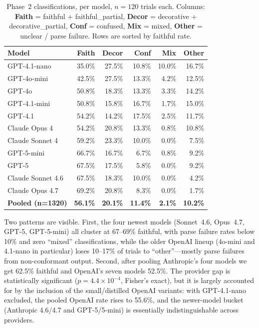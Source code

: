 \documentclass[11pt]{article}
\begin{document}
\begin{table}[t]
\centering
\small
\caption{Phase~2 classifications, per model, $n=120$ trials each. Columns: \textbf{Faith} = faithful + faithful\_partial, \textbf{Decor} = decorative + decorative\_partial, \textbf{Conf} = confused, \textbf{Mix} = mixed, \textbf{Other} = unclear / parse failure. Rows are sorted by faithful rate.}
\label{tab:phase2}
\begin{tabular}{lrrrrr}
\toprule
Model & Faith & Decor & Conf & Mix & Other \\
\midrule
GPT-4.1-nano               & 35.0\% & 27.5\% & 10.8\% & 10.0\% & 16.7\% \\
GPT-4o-mini                & 42.5\% & 27.5\% & 13.3\% &  4.2\% & 12.5\% \\
GPT-4o                     & 50.8\% & 18.3\% & 13.3\% &  3.3\% & 14.2\% \\
GPT-4.1-mini               & 50.8\% & 15.8\% & 16.7\% &  1.7\% & 15.0\% \\
GPT-4.1                    & 54.2\% & 14.2\% & 17.5\% &  2.5\% & 11.7\% \\
Claude Opus 4              & 54.2\% & 20.8\% & 13.3\% &  0.8\% & 10.8\% \\
Claude Sonnet 4            & 59.2\% & 23.3\% & 10.0\% &  0.0\% &  7.5\% \\
GPT-5-mini                 & 66.7\% & 16.7\% &  6.7\% &  0.8\% &  9.2\% \\
GPT-5                      & 67.5\% & 17.5\% &  5.8\% &  0.0\% &  9.2\% \\
Claude Sonnet 4.6          & 67.5\% & 18.3\% & 10.0\% &  0.0\% &  4.2\% \\
Claude Opus 4.7            & 69.2\% & 20.8\% &  8.3\% &  0.0\% &  1.7\% \\
\midrule
\textbf{Pooled (n=1320)}   & \textbf{56.1\%} & \textbf{20.1\%} & \textbf{11.4\%} & \textbf{2.1\%} & \textbf{10.2\%} \\
\bottomrule
\end{tabular}
\end{table}

Two patterns are visible. First, the four newest models (Sonnet~4.6, Opus~4.7, GPT-5, GPT-5-mini) all cluster at 67--69\% faithful, with parse failure rates below 10\% and zero ``mixed'' classifications, while the older OpenAI lineup (4o-mini and 4.1-nano in particular) loses 10--17\% of trials to ``other''---mostly parse failures from non-conformant output. Second, after pooling Anthropic's four models we get 62.5\% faithful and OpenAI's seven models 52.5\%. The provider gap is statistically significant ($p=4.4\!\times\!10^{-4}$, Fisher's exact), but it is largely accounted for by the inclusion of the small/distilled OpenAI variants: with GPT-4.1-nano excluded, the pooled OpenAI rate rises to 55.6\%, and the newer-model bucket (Anthropic 4.6/4.7 and GPT-5/5-mini) is essentially indistinguishable across providers.
\end{document}
